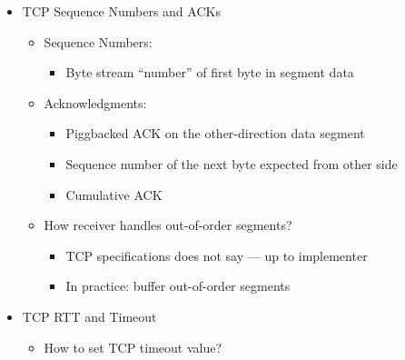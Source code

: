 \begin{itemize}
\begin{itemize}
\begin{itemize}
        \end{itemize}

    \end{itemize}

  \item TCP Sequence Numbers and ACKs

    \begin{itemize}

      \item Sequence Numbers:

        \begin{itemize}

          \item Byte stream ``number'' of first byte in segment data

        \end{itemize}

      \item Acknowledgments:

        \begin{itemize}

          \item Piggbacked ACK on the other-direction data segment

          \item Sequence number of the next byte expected from other side

          \item Cumulative ACK

        \end{itemize}

      \item How receiver handles out-of-order segments?

        \begin{itemize}

          \item TCP specifications does not say — up to implementer

          \item In practice: buffer out-of-order segments

        \end{itemize}

    \end{itemize}

  \item TCP RTT and Timeout

    \begin{itemize}

      \item How to set TCP timeout value?


\end{itemize}
\end{itemize}
